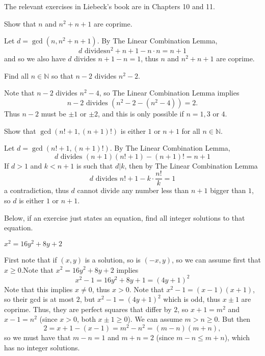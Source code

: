 \documentclass[11pt,dvipsnames]{book}
\numberwithin{figure}{section} %
\numberwithin{table}{section} %
\begin{document}
The relevant exercises in Liebeck's book are in Chapters 10 and 11.

\begin{exercise} Show that $n$ and $n^2+n+1$ are coprime.

\begin{solution}
Let $d=\gcd(n,n^2+n+1)$. By The Linear Combination Lemma,
\[
d\text{ divides} n^2+n+1 - n\cdot n = n+1
\]
and so we also have $d$ divides $ n+1 - n =1$, thus $n$ and $n^2+n+1$ are coprime.
\end{solution}
\end{exercise}

\begin{exercise} Find all $n\in\mathbb{N}$ so that $n-2$ divides $n^2-2$.

\begin{solution}
Note that $n-2$ divides $n^2-4$, so The Linear Combination Lemma implies
\[
n-2\text{ divides } (n^2-2-(n^2-4))=2.
\]
Thus $n-2$ must be $\pm 1$ or $\pm 2$, and this is only possible if $n=1,3$ or $4$.
\end{solution}

\end{exercise}

\begin{exercise} Show that $\gcd(n!+1,(n+1)!)$ is either $1$ or $n+1$ for all $n\in\mathbb{N}$.

\begin{solution}
Let $d=\gcd(n!+1,(n+1)!)$. By The Linear Combination Lemma,
\[
d \text{ divides } (n+1)(n!+1)-(n+1)! = n+1
\]
If $d>1$ and $k<n+1$ is such that $d|k$, then  by The Linear Combination Lemma
\[
d \text{ divides } n!+1- k\cdot \frac{n!}{k} =1
\]
a contradiction, thus $d$ cannot divide any number less than $n+1$ bigger than $1$, so $d$ is either $1$ or $n+1$.
\end{solution}

\end{exercise}

Below, if an exercise just states an equation, find all integer solutions to that equation.

\begin{exercise}
 $x^2=16y^2+8y+2$

\begin{solution}
First note that if $(x,y)$ is a solution, so is $(-x,y)$, so we can assume first that $x\geq 0$.Note that $x^2=16y^2+8y+2$ implies
\[
x^2-1 =16y^2+8y+1=(4y+1)^2
\]
Note that this implies $x\neq 0$, thus $x>0$. Note that $x^2-1=(x-1)(x+1)$, so their gcd is at most $2$, but $x^2-1=(4y+1)^2$ which is odd, thus $x\pm 1$ are coprime. Thus, they are perfect squares that differ by $2$, so $x+1=m^2$ and $x-1=n^2$ (since $x>0$, both $x\pm 1\geq 0$). We can assume  $m>n\geq 0$. But then
\[
2= x+1-(x-1) = m^2-n^2 = (m-n)(m+n),
\]
so we must have that $m-n=1$ and $m+n=2$ (since $m-n\leq m+n$), which has no integer solutions.
\end{solution}
\end{exercise}
\end{document}
